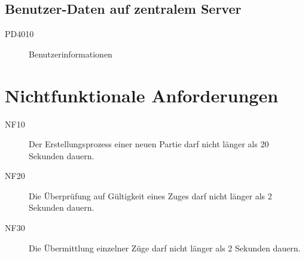 \documentclass[parskip=full]{scrartcl}
\begin{document}
\subsection{Benutzer-Daten auf zentralem Server}
\begin{description}
	\item[PD4010]  Benutzerinformationen
\end{description}
\newpage
\section{Nichtfunktionale Anforderungen}
\begin{description}
	
	\item[NF10] Der Erstellungsprozess einer neuen Partie darf nicht länger als 20 Sekunden dauern.
	\item[NF20] Die Überprüfung auf Gültigkeit eines Zuges darf nicht länger als 2 Sekunden dauern.
	\item[NF30] Die Übermittlung einzelner Züge darf nicht länger als 2 Sekunden dauern.
	
\end{description}
\newpage
\end{document}

